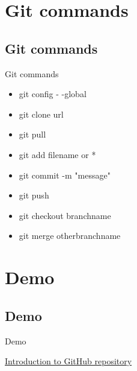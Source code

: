\section{Git commands}
\subsection{Git commands}
\begin{frame}{Git commands}
    \begin{itemize}
        \item git config - -global
        \item git clone url
        \item git pull
        \item git add filename or *
        \item git commit -m "message"
        \item git push
        \item git checkout branchname
        \item git merge otherbranchname
    \end{itemize}
\end{frame}

\section{Demo}
\subsection{Demo}
\begin{frame}{Demo}
    \centering

    \href{https://github.com/taborda11/IntroductionGithub}{Introduction to GitHub repository}
    
\end{frame}

